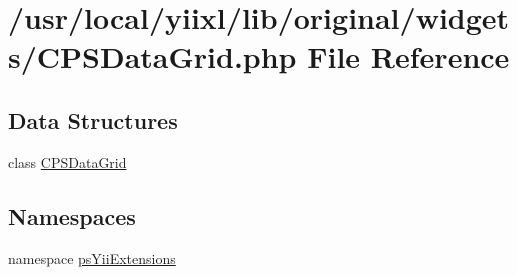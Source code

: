 \hypertarget{CPSDataGrid_8php}{
\section{/usr/local/yiixl/lib/original/widgets/CPSDataGrid.php File Reference}
\label{CPSDataGrid_8php}
}
\subsection*{Data Structures}
\begin{DoxyCompactItemize}
\item 
class \hyperlink{classCPSDataGrid}{CPSDataGrid}
\end{DoxyCompactItemize}
\subsection*{Namespaces}
\begin{DoxyCompactItemize}
\item 
namespace \hyperlink{namespacepsYiiExtensions}{psYiiExtensions}
\end{DoxyCompactItemize}
